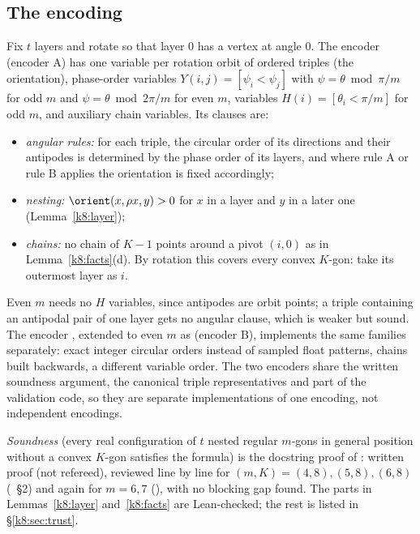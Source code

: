 \subsection{The encoding}\label{k8:sec:enc}

Fix $t$ layers and rotate so that layer $0$ has a vertex at angle $0$. The encoder  (encoder A) has
one variable per rotation orbit of ordered triples (the orientation), phase-order variables $Y(i,j)=[\psi_i<\psi_j]$
with $\psi=\theta\bmod\pi/m$ for odd $m$ and $\psi=\theta\bmod 2\pi/m$ for even $m$, variables $H(i)=[\theta_i<\pi/m]$ for
odd $m$, and auxiliary chain variables. Its clauses are:
\begin{itemize}
\item\emph{angular rules:} for each triple, the circular order of its directions and their antipodes is determined by
the phase order of its layers, and where rule A or rule B applies the orientation is fixed accordingly;
\item\emph{nesting:} $\orient(x,\rho x,y)>0$ for $x$ in a layer and $y$ in a later one (Lemma~\ref{k8:layer});
\item\emph{chains:} no chain of $K-1$ points around a pivot $(i,0)$ as in Lemma~\ref{k8:facts}(d). By rotation this
covers every convex $K$-gon: take its outermost layer as $i$.
\end{itemize}
Even $m$ needs no $H$ variables, since antipodes are orbit points; a triple containing an antipodal pair of one layer
gets no angular clause, which is weaker but sound. The encoder , extended to even $m$ as
 (encoder B), implements the same families separately: exact integer circular orders
instead of sampled float patterns, chains built backwards, a different variable order. The two encoders share the
written soundness argument, the canonical triple representatives and part of the validation code, so they are separate
implementations of one encoding, not independent encodings.

\emph{Soundness} (every real configuration of $t$ nested regular $m$-gons in general position without a convex $K$-gon
satisfies the formula) is the docstring proof of : written proof (not refereed), reviewed line by line for
$(m,K)=(4,8),(5,8),(6,8)$ (~\S2) and again for $m=6,7$ (), with no blocking gap found. The
parts in Lemmas~\ref{k8:layer} and~\ref{k8:facts} are Lean-checked; the rest is listed in \S\ref{k8:sec:trust}.

